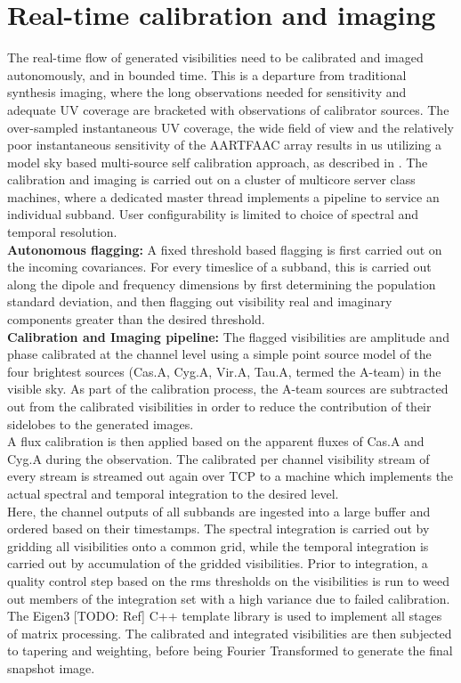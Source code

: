 \documentclass{ws-jai}
\begin{document}
\section {\label{sec:calim} Real-time calibration and imaging}
The real-time  flow of generated visibilities  need to be calibrated  and imaged
autonomously,  and  in bounded  time.   This  is  a departure  from  traditional
synthesis  imaging,  where the  long  observations  needed for  sensitivity  and
adequate UV coverage are bracketed  with observations of calibrator sources. The
over-sampled instantaneous UV coverage, the wide field of view and the relatively
poor instantaneous sensitivity  of the AARTFAAC array results in  us utilizing a
model sky  based multi-source self  calibration approach, as described  in \cite
{prasad2014real}.  The  calibration and imaging is  carried out on a  cluster of
multicore server  class machines, where  a dedicated master thread  implements a
pipeline to service  an individual subband.  User configurability  is limited to
choice of spectral and temporal resolution.\\

\noindent \textbf {Autonomous flagging:} A fixed threshold based flagging is first carried
out  on the  incoming covariances.  For every  timeslice of  a subband,  this is
carried out along  the dipole and frequency dimensions by  first determining the
population  standard  deviation,  and  then flagging  out  visibility  real  and
imaginary components greater than the desired threshold.\\

\noindent \textbf  {Calibration  and  Imaging  pipeline:}  The  flagged  visibilities  are
amplitude and phase calibrated at the  channel level using a simple point source
model of  the four  brightest sources  (Cas.A, Cyg.A,  Vir.A, Tau.A,  termed the
A-team)  in the  visible sky.  As part  of the  calibration process,  the A-team
sources are subtracted  out from the calibrated visibilities in  order to reduce
the  contribution  of  their  sidelobes   to  the  generated  images.\\  A  flux
calibration is  then applied  based on  the apparent fluxes  of Cas.A  and Cyg.A
during the  observation. The calibrated  per channel visibility stream  of every
stream is streamed out  again over TCP to a machine  which implements the actual
spectral and temporal integration to the desired level.\\

Here, the channel outputs  of all subbands are ingested into  a large buffer and
ordered based on  their timestamps.  The spectral integration is  carried out by
gridding all visibilities onto a common  grid, while the temporal integration is
carried out by accumulation of the gridded visibilities. Prior to integration, a
quality control step based  on the rms thresholds on the  visibilities is run to
weed out  members of  the integration  set with  a high  variance due  to failed
calibration.  The Eigen3  [TODO: Ref] C++ template library is  used to implement
all stages of matrix processing.  The calibrated and integrated visibilities are
then subjected  to tapering and  weighting, before being Fourier  Transformed to
generate the final snapshot image.\\
\end{document}
